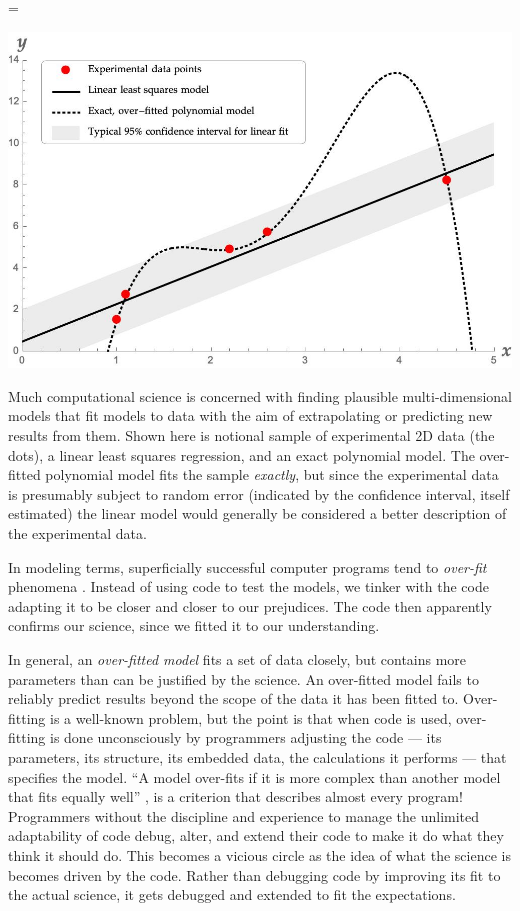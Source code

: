 \begin{figure\figureStarDetails}[t]
{ \newdimen \imageWidth 
  \imageWidth=\textwidth
  \imageWidthCalculation
  \begin{center}\includegraphics[width=\imageWidth]{
generated/mathematicaplot.jpg
}\end{center}}
\caption{Much computational science is concerned with finding plausible multi-dimensional models that fit models to data with the aim of extrapolating or predicting new results from them. Shown here is notional sample of experimental 2D data (the dots), a linear least squares regression, and an exact polynomial model. The over-fitted polynomial model fits the sample \emph{exactly\/}, but since the experimental data is presumably subject to random error (indicated by the confidence interval, itself estimated) the linear model would generally be considered a better description of the experimental data.}
\label{fig-overfit}
\end{figure\figureStarDetails}

In modeling terms, superficially successful computer programs tend to \emph{over-fit\/} phenomena \cite{over-fit}. Instead of using code to test the models, we tinker with the code adapting it to be closer and closer to our prejudices. The code then apparently confirms our science, since we fitted it to our understanding.  

In general, an \emph{over-fitted model\/} fits a set of data closely, but contains more parameters than can be justified by the science. An over-fitted model fails to reliably predict results beyond the scope of the data it has been fitted to. Over-fitting is a well-known problem, but the point is that when code is used, over-fitting is done unconsciously by programmers adjusting the code --- its parameters, its structure, its embedded data, the calculations it performs --- that specifies the model. ``A model over-fits if it is  more complex than another model that fits equally well'' \cite{over-fit}, is a criterion that describes almost every program! Programmers without the discipline and experience to manage the unlimited adaptability of code debug, alter, and extend their code to make it do what they think it should do. This becomes a vicious circle as the idea of what the science is becomes driven by the code. Rather than debugging code by improving its fit to the actual science, it gets debugged and extended to fit the expectations.  


